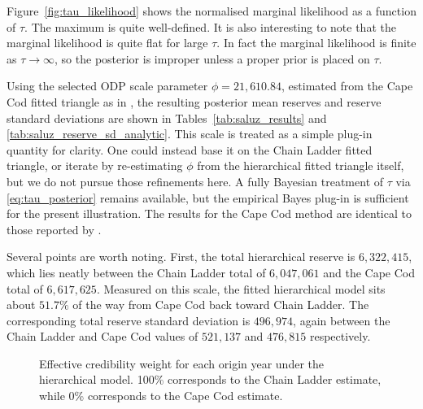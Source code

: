 \documentclass[11pt]{article}
\newcommand{\1}{\mathbf{1}}
\begin{document}
Figure~\ref{fig:tau_likelihood} shows the normalised marginal likelihood as a function of $\tau$. The maximum is quite well-defined. It is also interesting to note that 
the marginal likelihood is quite flat for large $\tau$. In fact the marginal likelihood is finite as $\tau\rightarrow\infty$, so the posterior is improper unless a proper prior is placed on $\tau$.

Using the selected ODP scale parameter $\phi=21,610.84$, estimated from the Cape Cod fitted triangle as in 
\citet{Saluz2015CapeCod}, the resulting posterior mean reserves and reserve standard deviations are shown in 
Tables~\ref{tab:saluz_results} and \ref{tab:saluz_reserve_sd_analytic}. This scale is treated as a simple plug-in quantity 
for clarity. One could instead base it on the Chain Ladder fitted triangle, or iterate by re-estimating $\phi$ from the hierarchical fitted triangle itself, but we do not pursue those refinements here. A fully Bayesian treatment of $\tau$ via \eqref{eq:tau_posterior} remains available, but the empirical Bayes plug-in is sufficient for the present illustration. The results for
the Cape Cod method are identical to those reported by \citet{Saluz2015CapeCod}.

Several points are worth noting. First, the total hierarchical reserve is $ 6,322,415$, which lies neatly between the Chain Ladder total of $6,047,061$ and the Cape Cod total of 
$6,617,625$. Measured on this scale, the fitted hierarchical model sits about $51.7\%$ of the way from Cape Cod back toward Chain Ladder. 
The corresponding total reserve standard deviation is $496,974 $, again between the Chain Ladder and Cape Cod values of $521,137$ and $476,815$ respectively.


\begin{figure}[htbp]
\centering
{}
\caption{Effective credibility weight for each origin year under the hierarchical model. 100\% corresponds to 
the Chain Ladder estimate, while 0\% corresponds to the Cape Cod estimate.}
\label{fig:effective_credibility}
\end{figure}
\end{document}
